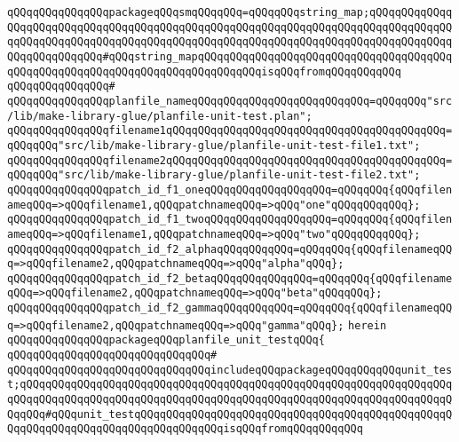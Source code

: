 \verb|qQQqqQQqqQQqqQQqpackageqQQqsmqQQqqQQq=qQQqqQQqstring_map;qQQqqQQqqQQqqQQqqQQqqQQqqQQqqQQqqQQqqQQqqQQqqQQqqQQqqQQqqQQqqQQqqQQqqQQqqQQqqQQqqQQqqQQqqQQqqQQqqQQqqQQqqQQqqQQqqQQqqQQqqQQqqQQqqQQqqQQqqQQqqQQqqQQqqQQqqQQqqQQqqQQqqQQq#qQQqstring_mapqQQqqQQqqQQqqQQqqQQqqQQqqQQqqQQqqQQqqQQqqQQqqQQqqQQqqQQqqQQqqQQqqQQqqQQqqQQqqQQqisqQQqfromqQQqqQQqqQQq|\newline
\verb|qQQqqQQqqQQqqQQq#|\newline
\verb|qQQqqQQqqQQqqQQqplanfile_nameqQQqqQQqqQQqqQQqqQQqqQQqqQQq=qQQqqQQq"src/lib/make-library-glue/planfile-unit-test.plan";|\newline
\newline
\verb|qQQqqQQqqQQqqQQqfilename1qQQqqQQqqQQqqQQqqQQqqQQqqQQqqQQqqQQqqQQqqQQq=qQQqqQQq"src/lib/make-library-glue/planfile-unit-test-file1.txt";|\newline
\verb|qQQqqQQqqQQqqQQqfilename2qQQqqQQqqQQqqQQqqQQqqQQqqQQqqQQqqQQqqQQqqQQq=qQQqqQQq"src/lib/make-library-glue/planfile-unit-test-file2.txt";|\newline
\newline
\verb|qQQqqQQqqQQqqQQqpatch_id_f1_oneqQQqqQQqqQQqqQQqqQQq=qQQqqQQq{qQQqfilenameqQQq=>qQQqfilename1,qQQqpatchnameqQQq=>qQQq"one"qQQqqQQqqQQq};|\newline
\verb|qQQqqQQqqQQqqQQqpatch_id_f1_twoqQQqqQQqqQQqqQQqqQQq=qQQqqQQq{qQQqfilenameqQQq=>qQQqfilename1,qQQqpatchnameqQQq=>qQQq"two"qQQqqQQqqQQq};|\newline
\newline
\verb|qQQqqQQqqQQqqQQqpatch_id_f2_alphaqQQqqQQqqQQq=qQQqqQQq{qQQqfilenameqQQq=>qQQqfilename2,qQQqpatchnameqQQq=>qQQq"alpha"qQQq};|\newline
\verb|qQQqqQQqqQQqqQQqpatch_id_f2_betaqQQqqQQqqQQqqQQq=qQQqqQQq{qQQqfilenameqQQq=>qQQqfilename2,qQQqpatchnameqQQq=>qQQq"beta"qQQqqQQq};|\newline
\verb|qQQqqQQqqQQqqQQqpatch_id_f2_gammaqQQqqQQqqQQq=qQQqqQQq{qQQqfilenameqQQq=>qQQqfilename2,qQQqpatchnameqQQq=>qQQq"gamma"qQQq};|\newline
\newline
\verb|herein|\newline
\newline
\verb|qQQqqQQqqQQqqQQqpackageqQQqplanfile_unit_testqQQq{|\newline
\verb|qQQqqQQqqQQqqQQqqQQqqQQqqQQqqQQq#|\newline
\verb|qQQqqQQqqQQqqQQqqQQqqQQqqQQqqQQqincludeqQQqpackageqQQqqQQqqQQqunit_test;qQQqqQQqqQQqqQQqqQQqqQQqqQQqqQQqqQQqqQQqqQQqqQQqqQQqqQQqqQQqqQQqqQQqqQQqqQQqqQQqqQQqqQQqqQQqqQQqqQQqqQQqqQQqqQQqqQQqqQQqqQQqqQQqqQQqqQQqqQQqqQQq#qQQqunit_testqQQqqQQqqQQqqQQqqQQqqQQqqQQqqQQqqQQqqQQqqQQqqQQqqQQqqQQqqQQqqQQqqQQqqQQqqQQqqQQqqQQqisqQQqfromqQQqqQQqqQQq|\newline
